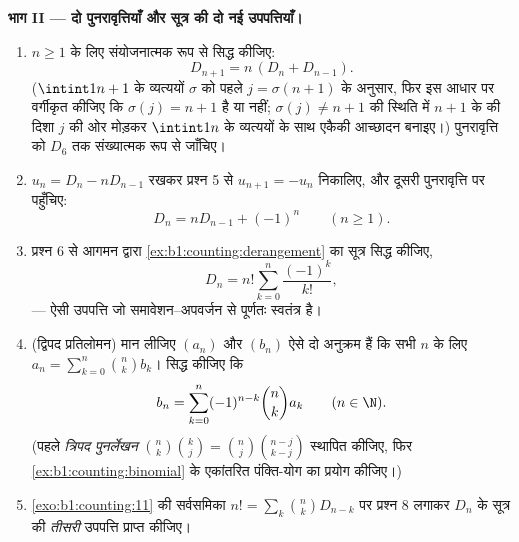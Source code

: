 \begin{problem}
\medskip \noindent\textbf{भाग II --- दो पुनरावृत्तियाँ और सूत्र की दो नई
उपपत्तियाँ।}
\begin{enumerate}[resume]
  \item $n \geq 1$ के लिए संयोजनात्मक रूप से सिद्ध कीजिए:
        \[
        D_{n+1} = n\,(D_n + D_{n-1}) .
        \]
        ($\intint1{n+1}$ के व्यत्ययों $\sigma$ को पहले $j = \sigma(n+1)$ के
        अनुसार, फिर इस आधार पर वर्गीकृत कीजिए कि $\sigma(j) = n + 1$ है या
        नहीं; $\sigma(j) \neq n+1$ की स्थिति में $n + 1$ के 
        की दिशा $j$ की ओर मोड़कर $\intint1n$ के व्यत्ययों के साथ एकैकी
        आच्छादन बनाइए।) पुनरावृत्ति को $D_6$ तक संख्यात्मक रूप से जाँचिए।
  \item $u_n = D_n - n D_{n-1}$ रखकर प्रश्न 5 से $u_{n+1} = -u_n$ निकालिए,
  और दूसरी पुनरावृत्ति पर पहुँचिए:
        \[
        D_n = n D_{n-1} + (-1)^n \qquad (n \geq 1).
        \]
  \item प्रश्न 6 से आगमन द्वारा \cref{ex:b1:counting:derangement} का सूत्र
  सिद्ध कीजिए,
        \[
        D_n = n! \sum_{k=0}^{n} \frac{(-1)^k}{k!},
        \]
        --- ऐसी उपपत्ति जो समावेशन--अपवर्जन से पूर्णतः स्वतंत्र है।
  \item (द्विपद प्रतिलोमन) मान लीजिए $(a_n)$ और $(b_n)$ ऐसे दो अनुक्रम हैं
  कि सभी $n$ के लिए $a_n = \sum_{k=0}^n \binom nk b_k$। सिद्ध कीजिए कि
        \[
        b_n = \sum_{k=0}^{n} (-1)^{n-k} \binom nk a_k
        \qquad (n \in \N).
        \]
        (पहले \emph{त्रिपद पुनर्लेखन} $\binom nk \binom kj = \binom nj
        \binom{n-j}{k-j}$ स्थापित कीजिए, फिर \cref{ex:b1:counting:binomial}
        के एकांतरित पंक्ति-योग का प्रयोग कीजिए।)
  \item \cref{exo:b1:counting:11} की सर्वसमिका $n! = \sum_k \binom nk
  D_{n-k}$ पर प्रश्न 8 लगाकर $D_n$ के सूत्र की \emph{तीसरी} उपपत्ति प्राप्त
  कीजिए।
\end{enumerate}


\end{problem}
